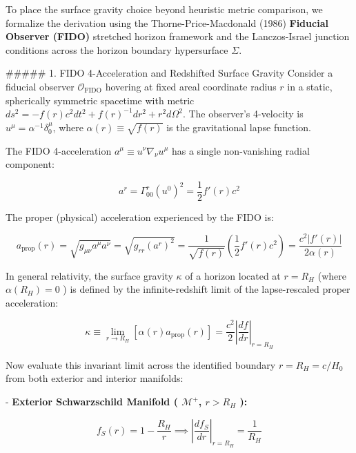 \documentclass[11pt,a4paper]{article}
\theoremstyle{definition}
\theoremstyle{remark}
\begin{document}
To place the surface gravity choice beyond heuristic metric comparison, we formalize the derivation using the Thorne-Price-Macdonald (1986) \textbf{Fiducial Observer (FIDO)} stretched horizon framework and the Lanczos-Israel junction conditions across the horizon boundary hypersurface $\Sigma$.

\#\#\#\#\# 1. FIDO 4-Acceleration and Redshifted Surface Gravity
Consider a fiducial observer $\mathcal{O}_{\text{FIDO}}$ hovering at fixed areal coordinate radius $r$ in a static, spherically symmetric spacetime with metric $ds^2 = -f(r) c^2 dt^2 + f(r)^{-1} dr^2 + r^2 d\Omega^2$. The observer's 4-velocity is $u^\mu = \alpha^{-1} \delta^\mu_0$, where $\alpha(r) \equiv \sqrt{f(r)}$ is the gravitational lapse function.

The FIDO 4-acceleration $a^\mu \equiv u^\nu \nabla_\nu u^\mu$ has a single non-vanishing radial component:


\begin{equation}
a^r = \Gamma^r_{00} (u^0)^2 = \frac{1}{2} f'(r) c^2
\end{equation}


The proper (physical) acceleration experienced by the FIDO is:


\begin{equation}
a_{\text{prop}}(r) = \sqrt{g_{\mu\nu} a^\mu a^\nu} = \sqrt{g_{rr} (a^r)^2} = \frac{1}{\sqrt{f(r)}} \left(\frac{1}{2} f'(r) c^2\right) = \frac{c^2 |f'(r)|}{2 \alpha(r)}
\end{equation}


In general relativity, the surface gravity $\kappa$ of a horizon located at $r = R_H$ (where $\alpha(R_H) = 0$ ) is defined by the infinite-redshift limit of the lapse-rescaled proper acceleration:


\begin{equation}
\kappa \equiv \lim_{r \to R_H} \left[ \alpha(r) a_{\text{prop}}(r) \right] = \frac{c^2}{2} \left| \frac{df}{dr} \right|_{r = R_H}
\end{equation}


Now evaluate this invariant limit across the identified boundary $r = R_H = c/H_0$ from both exterior and interior manifolds:

- \textbf{Exterior Schwarzschild Manifold ( $\mathcal{M}^+$, $r > R_H$ ):}


\begin{equation}
f_S(r) = 1 - \frac{R_H}{r} \implies \left| \frac{df_S}{dr} \right|_{r = R_H} = \frac{1}{R_H}
\end{equation}
\end{document}
